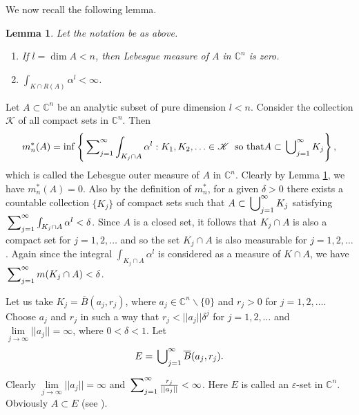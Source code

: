 \documentclass[11pt, reqno]{amsart}
\newtheorem*{cor A}{Corollary A}
\newtheorem*{cor B}{Corollary B}
\newtheorem{lem}{Lemma}[section]
\newcommand{\ol}{\overline}
\numberwithin{equation}{section}
\begin{document}
We now recall the following lemma.

\begin{lem}\cite[Lemma 2.2.9]{NW}\label{ln2.5a} Let the notation be as above.
\begin{enumerate}
\item[(i)] If $l=\dim A < n$, then Lebesgue measure of $A$ in $\mathbb{C}^n$ is zero.
\item [(ii)] $\int_{K\cap R(A)} \alpha^l < \infty$.
\end{enumerate}
\end{lem}

Let $A \subset  \mathbb{C}^n$ be an analytic subset of pure dimension $l<n$. Consider the collection $\mathscr{K}$ of all compact sets in $\mathbb{C}^n$. Then
\begin{align*}
\displaystyle m^*_n(A)=\inf\left\lbrace \sideset{}{_{j=1}^{\infty}}{\sum} \int_{K_j\cap A} \alpha ^l: K_1,K_2,\ldots\in \mathscr{K}\;\;\text{so that} A\subset \sideset{}{_{j=1}^{\infty}}{\bigcup} K_j \right\rbrace,
\end{align*}
which is called the Lebesgue outer measure of $A$ in $\mathbb{C}^n$. Clearly by Lemma \ref{ln2.5a}, we have $m^*_n(A)=0$. Also by the definition of $m^*_n$, for a given $\delta>0$ there exists a countable collection $\{K_j\}$ of compact sets such that $A\subset \sideset{}{_{j=1}^{\infty}}{\bigcup} K_j$ satisfying $\sideset{}{_{j=1}^{\infty}}{\sum} \int_{K_j\cap A} \alpha ^l<\delta$.
Since $A$ is a closed set, it follows that $K_j\cap A$ is also a compact set for $j=1,2,\ldots$ and so the set $K_j\cap A$ is also measurable for $j=1,2,\ldots$. Again since the integral $\int_{K_j\cap A} \alpha ^l$ is considered as a measure of $K\cap A$, we have $\sideset{}{_{j=1}^{\infty}}{\sum} m(K_j\cap A)<\delta$.

\medskip
Let us take $K_j=\ol B(a_j,r_j)$, where $a_j\in\mathbb{C}^n\backslash \{0\}$ and $r_j>0$ for $j=1,2,\ldots$. Choose $a_j$ and $r_j$ in such a way that $r_j<||a_j||\delta^j$ for $j=1,2,\ldots$ and $\lim\limits_{j\to\infty}||a_j||=\infty$, where $0<\delta<1$.
Let
\begin{align*}
 \displaystyle E=\sideset{}{_{j=1}^{\infty}}{\bigcup} \ol B(a_j,r_j).
 \end{align*}

Clearly $\lim\limits_{j\to\infty}||a_j||=\infty$ and $\sideset{}{_{j=1}^{\infty}}{\sum}\frac{r_j}{||a_j||}<\infty$. Here $E$ is called an $\varepsilon$-set in $\mathbb{C}^n$. Obviously $A\subset E$ (see \cite{Majumder-Sarkar-2026}).
\end{document}
